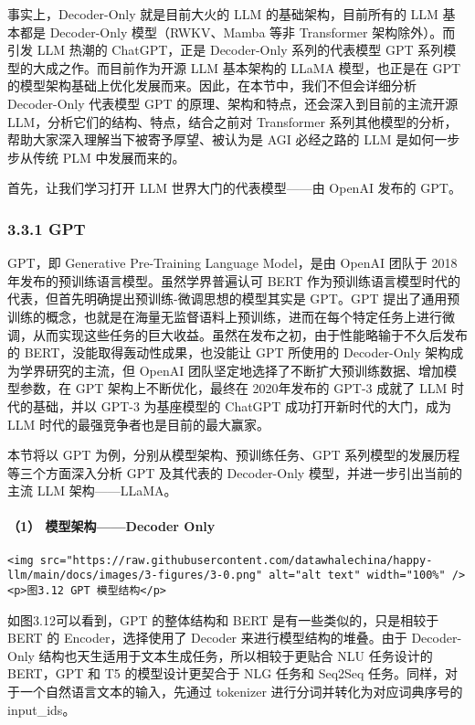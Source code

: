\documentclass[
]{article}
\begin{document}
事实上，Decoder-Only 就是目前大火的 LLM 的基础架构，目前所有的 LLM
基本都是 Decoder-Only 模型（RWKV、Mamba 等非 Transformer
架构除外）。而引发 LLM 热潮的 ChatGPT，正是 Decoder-Only 系列的代表模型
GPT 系列模型的大成之作。而目前作为开源 LLM 基本架构的 LLaMA
模型，也正是在 GPT
的模型架构基础上优化发展而来。因此，在本节中，我们不但会详细分析
Decoder-Only 代表模型 GPT 的原理、架构和特点，还会深入到目前的主流开源
LLM，分析它们的结构、特点，结合之前对 Transformer
系列其他模型的分析，帮助大家深入理解当下被寄予厚望、被认为是 AGI
必经之路的 LLM 是如何一步步从传统 PLM 中发展而来的。

首先，让我们学习打开 LLM 世界大门的代表模型------由 OpenAI 发布的 GPT。

\subsubsection{3.3.1 GPT}\label{gpt}

GPT，即 Generative Pre-Training Language Model，是由 OpenAI 团队于
2018年发布的预训练语言模型。虽然学界普遍认可 BERT
作为预训练语言模型时代的代表，但首先明确提出预训练-微调思想的模型其实是
GPT。GPT
提出了通用预训练的概念，也就是在海量无监督语料上预训练，进而在每个特定任务上进行微调，从而实现这些任务的巨大收益。虽然在发布之初，由于性能略输于不久后发布的
BERT，没能取得轰动性成果，也没能让 GPT 所使用的 Decoder-Only
架构成为学界研究的主流，但 OpenAI
团队坚定地选择了不断扩大预训练数据、增加模型参数，在 GPT
架构上不断优化，最终在 2020年发布的 GPT-3 成就了 LLM 时代的基础，并以
GPT-3 为基座模型的 ChatGPT 成功打开新时代的大门，成为 LLM
时代的最强竞争者也是目前的最大赢家。

本节将以 GPT 为例，分别从模型架构、预训练任务、GPT
系列模型的发展历程等三个方面深入分析 GPT 及其代表的 Decoder-Only
模型，并进一步引出当前的主流 LLM 架构------LLaMA。

\paragraph{（1） 模型架构------Decoder
Only}\label{ux6a21ux578bux67b6ux6784decoder-only}

\begin{verbatim}
<img src="https://raw.githubusercontent.com/datawhalechina/happy-llm/main/docs/images/3-figures/3-0.png" alt="alt text" width="100%" />
<p>图3.12 GPT 模型结构</p>
\end{verbatim}

如图3.12可以看到，GPT 的整体结构和 BERT 是有一些类似的，只是相较于 BERT
的 Encoder，选择使用了 Decoder 来进行模型结构的堆叠。由于 Decoder-Only
结构也天生适用于文本生成任务，所以相较于更贴合 NLU 任务设计的 BERT，GPT
和 T5 的模型设计更契合于 NLG 任务和 Seq2Seq
任务。同样，对于一个自然语言文本的输入，先通过 tokenizer
进行分词并转化为对应词典序号的 input\_ids。
\end{document}
